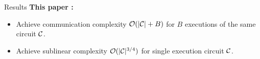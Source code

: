 \begin{frame}{Results}
	\textbf{This paper \cite{Weng0YX022}:}\pause
	\begin{itemize}
		\item Achieve communication complexity $\mathcal{O}(|\mathcal{C}| + B)$ for $B$ executions of the same circuit $\mathcal{C}$. \pause
		\item Achieve sublinear complexity $\mathcal{O}(|\mathcal{C}|^{3/4})$ for single execution circuit $\mathcal{C}$. 
	\end{itemize}
\end{frame}